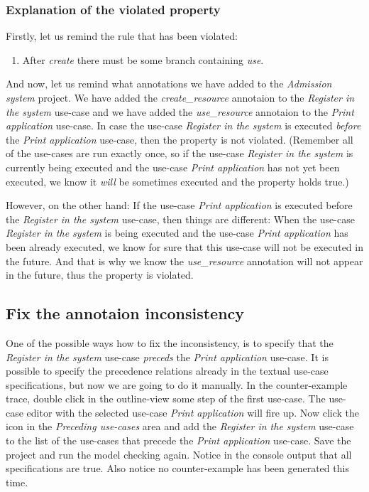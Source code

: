 \subsubsection{Explanation of the violated property}

Firstly, let us remind the rule that has been violated:

\begin{enumerate}
 \item After \emph{create} there must be some branch containing \emph{use}.
\end{enumerate}

And now, let us remind what annotations we have added to the \emph{Admission system} project. We have added the \emph{create\_resource}
annotaion to the \emph{Register in the system} use-case and we have added the \emph{use\_resource} annotaion to the
\emph{Print application} use-case. In case the use-case \emph{Register in the system} is executed \emph{before} the
\emph{Print application} use-case, then the property is not violated. (Remember all of the use-cases are run exactly once, so if
the use-case \emph{Register in the system} is currently being executed and the use-case \emph{Print application} has not yet been
executed, we know it \emph{will} be sometimes executed and the property holds true.)

However, on the other hand: If the use-case \emph{Print application} is executed before the \emph{Register in the system} use-case, then things
are different: When the use-case \emph{Register in the system} is being executed and the use-case \emph{Print application} has been
already executed, we know for sure that this use-case will not be executed in the future. And that is why we know the \emph{use\_resource}
annotation will not appear in the future, thus the property is violated.

\subsection{Fix the annotaion inconsistency}

One of the possible ways how to fix the inconsistency, is to specify that the \emph{Register in the system} use-case \emph{preceds} the
\emph{Print application} use-case. It is possible to specify the precedence relations already in the textual use-case specifications,
but now we are going to do it manually. In the counter-example trace, double click in the outline-view some step of the first use-case.
The use-case editor with the selected use-case \emph{Print application} will fire up. Now click the icon in the
\emph{Preceding use-cases} area and add the \emph{Register in the system} use-case to the list of the use-cases that precede the
\emph{Print application} use-case. Save the project and run the model checking again. Notice in the console output that all specifications
are true. Also notice no counter-example has been generated this time.